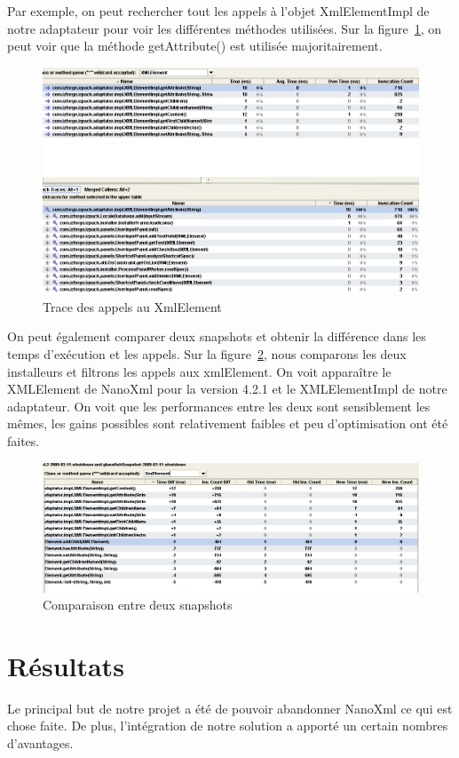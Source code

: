 Par exemple, on peut rechercher tout les appels à l'objet XmlElementImpl de notre adaptateur pour voir les différentes méthodes utilisées. Sur la figure~\ref{fig:yourkitXmlElement}, on peut voir que la méthode getAttribute() est utilisée majoritairement.
\begin{figure}[H]
	\centering
	\includegraphics[width=1\textwidth]{../image/yourkitXmlElement.png}
	\caption{Trace des appels au XmlElement}
	\label{fig:yourkitXmlElement}
\end{figure}

On peut également comparer deux snapshots et obtenir la différence dans les temps d'exécution et les appels.
Sur la figure~\ref{fig:yourkitComparaison}, nous comparons les deux installeurs et filtrons les appels aux xmlElement.
On voit apparaître le XMLElement de NanoXml pour la version 4.2.1 et le XMLElementImpl de notre adaptateur.
On voit que les performances entre les deux sont sensiblement les mêmes, les gains possibles sont relativement faibles et peu d'optimisation ont été faites. 
\begin{figure}[H]
	\centering
	\includegraphics[width=1\textwidth]{../image/yourkitComparaison.png}
	\caption{Comparaison entre deux snapshots}
	\label{fig:yourkitComparaison}
\end{figure}
\section{Résultats}
Le principal but de notre projet a été de pouvoir abandonner NanoXml ce qui est chose faite.
De plus, l'intégration de notre solution a apporté un certain nombres d'avantages.
